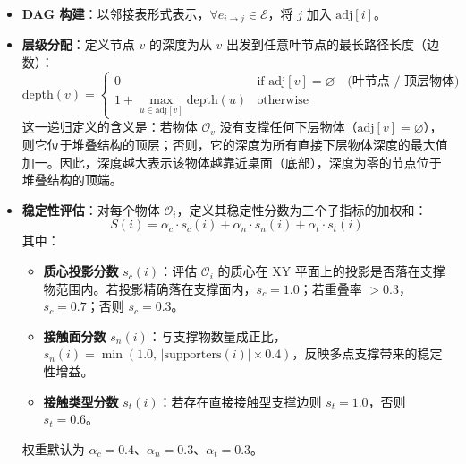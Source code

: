 \documentclass[12pt,a4paper]{article}
\begin{document}
\begin{itemize}
    \item \textbf{DAG 构建}：以邻接表形式表示，$\forall e_{i \to j} \in \mathcal{E}$，将 $j$ 加入 $\text{adj}[i]$。
    \item \textbf{层级分配}：定义节点 $v$ 的深度为从 $v$ 出发到任意叶节点的最长路径长度（边数）：
    \[
    \text{depth}(v) = \begin{cases}
        0 & \text{if } \text{adj}[v] = \varnothing \quad\text{(叶节点 / 顶层物体)}\\[4pt]
        \displaystyle 1 + \max_{u \in \text{adj}[v]} \text{depth}(u) & \text{otherwise}
    \end{cases}
    \]
    这一递归定义的含义是：若物体 $\mathcal{O}_v$ 没有支撑任何下层物体（$\text{adj}[v] = \varnothing$），则它位于堆叠结构的顶层；否则，它的深度为所有直接下层物体深度的最大值加一。因此，深度越大表示该物体越靠近桌面（底部），深度为零的节点位于堆叠结构的顶端。
    \item \textbf{稳定性评估}：对每个物体 $\mathcal{O}_i$，定义其稳定性分数为三个子指标的加权和：
    \[
    S(i) = \alpha_c \cdot s_c(i) + \alpha_n \cdot s_n(i) + \alpha_t \cdot s_t(i)
    \]
    其中：
    \begin{itemize}
        \item \textbf{质心投影分数} $s_c(i)$：评估 $\mathcal{O}_i$ 的质心在 XY 平面上的投影是否落在支撑物范围内。若投影精确落在支撑面内，$s_c = 1.0$；若重叠率 $> 0.3$，$s_c = 0.7$；否则 $s_c = 0.3$。
        \item \textbf{接触面分数} $s_n(i)$：与支撑物数量成正比，$s_n(i) = \min(1.0,\, |\text{supporters}(i)| \times 0.4)$，反映多点支撑带来的稳定性增益。
        \item \textbf{接触类型分数} $s_t(i)$：若存在直接接触型支撑边则 $s_t = 1.0$，否则 $s_t = 0.6$。
    \end{itemize}
    权重默认为 $\alpha_c = 0.4$、$\alpha_n = 0.3$、$\alpha_t = 0.3$。
\end{itemize}
\end{document}
